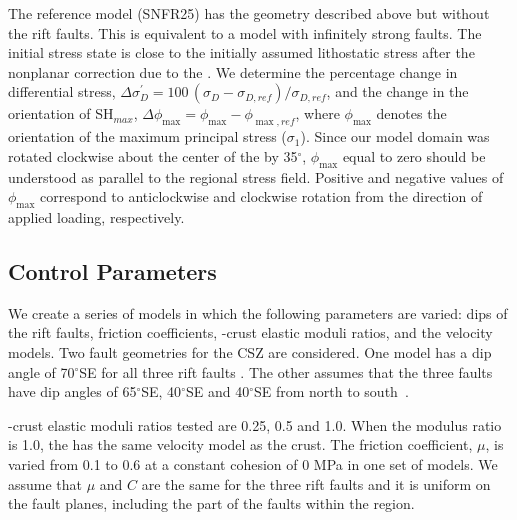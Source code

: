 \documentclass[draft]{agujournal2018}
\begin{document}
The reference model (SNFR25) has the geometry described above but without the rift faults. This is equivalent to a model with infinitely strong faults. The initial stress state is close to the initially assumed lithostatic stress after the nonplanar correction due to the . We determine the percentage change in differential stress, $\Delta\sigma_{D}^{\prime}=100\,( \sigma_{D}-\sigma_{D,ref}) / \sigma_{D,ref}$, and the change in the orientation of SH$_{max}$,  $\Delta\phi_{\max}=\phi_{\max}-\phi_{\max,ref}$, where $\phi_{\max}$ denotes the orientation of the maximum principal stress ($\sigma_1$). Since our model domain was rotated clockwise about the center of the  by 35$^\circ$, $\phi_{\max}$ equal to zero should be understood as parallel to the regional stress field. Positive and negative values of $\phi_{\max}$ correspond to anticlockwise and clockwise rotation from the direction of applied loading, respectively.  %


\subsection{Control Parameters}
We create a series of models in which the following parameters are varied: dips of the rift faults, friction coefficients, -crust elastic moduli ratios, and the velocity models. Two fault geometries for the CSZ are considered. One model has a dip angle of 70$^\circ$SE for all three rift faults \citep{Baird_2010}. The other assumes that the three faults have dip angles of 65$^\circ$SE, 40$^\circ$SE and 40$^\circ$SE from north to south~\citep{Powell_2017}.

-crust elastic moduli ratios tested are 0.25, 0.5 and 1.0. When the modulus ratio is 1.0, the  has the same velocity model as the crust. The friction coefficient, $\mu$, is varied from 0.1 to 0.6 at a constant cohesion of 0 MPa in one set of models. We assume that $\mu$ and $C$ are the same for the three rift faults and it is uniform on the fault planes, including the part of the faults within the  region. 
\end{document}
